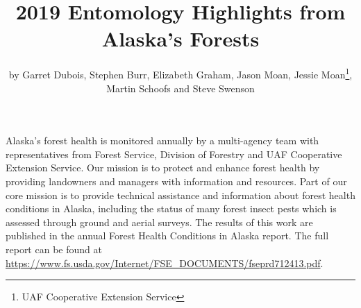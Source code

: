 \title{2019 Entomology Highlights from Alaska’s Forests}

\subtitle{}

\author{by Garret Dubois, Stephen Burr, Elizabeth Graham, Jason Moan, Jessie Moan\footnote{UAF Cooperative Extension Service}, Martin Schoofs and Steve Swenson}

\maketitle

Alaska’s forest health is monitored annually by a multi-agency team with representatives from  Forest Service,  Division of Forestry and UAF Cooperative Extension Service. Our mission is to protect and enhance forest health by providing landowners and managers with information and resources. Part of our core mission is to provide technical assistance and information about forest health conditions in Alaska, including the status of many forest insect pests which is assessed through ground and aerial surveys. The results of this work are published in the annual Forest Health Conditions in Alaska report. The full report can be found at \url{https://www.fs.usda.gov/Internet/FSE_DOCUMENTS/fseprd712413.pdf}. 


